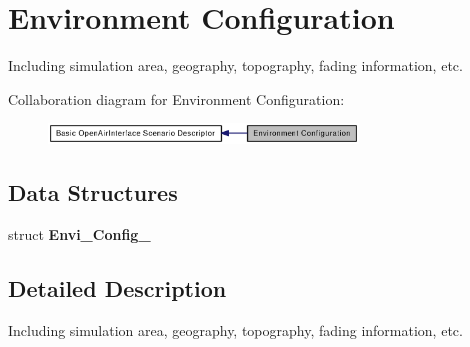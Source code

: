 \section{Environment Configuration}
\label{group____envi__config}
Including simulation area, geography, topography, fading information, etc.  




Collaboration diagram for Environment Configuration:\nopagebreak
\begin{figure}[H]
\begin{center}
\leavevmode
\includegraphics[width=233pt]{group____envi__config}
\end{center}
\end{figure}
\subsection*{Data Structures}
\begin{CompactItemize}
\item 
struct {\bf Envi\_\-Config\_\-}
\end{CompactItemize}


\subsection{Detailed Description}
Including simulation area, geography, topography, fading information, etc. 